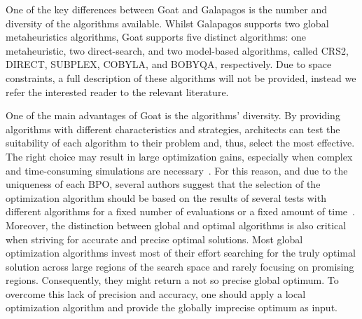	
	
	One of the key differences between Goat and Galapagos is the number and diversity of the algorithms available. Whilst Galapagos supports two global metaheuristics algorithms, Goat supports five distinct algorithms: one metaheuristic, two direct-search, and two model-based algorithms, called CRS2, DIRECT, SUBPLEX, COBYLA, and BOBYQA, respectively. Due to space constraints, a full description of these algorithms will not be provided, instead we refer the interested reader to the relevant literature.  
	
	One of the main advantages of Goat is the algorithms' diversity. By providing algorithms with different characteristics and strategies, architects can test the suitability of each algorithm to their problem and, thus, select the most effective. The right choice may result in large optimization gains, especially when complex and time-consuming simulations are necessary~\cite{Wortmann2016BBO}. For this reason, and due to the uniqueness of each \ac{BPO}, several authors suggest that the selection of the optimization algorithm should be based on the results of several tests with different algorithms for a fixed number of evaluations or a fixed amount of time~\cite{Hamdy2016,Wortmann2016BBO}. Moreover, the distinction between global and optimal algorithms is also critical when striving for accurate and precise optimal solutions. Most global optimization algorithms invest most of their effort searching for the truly optimal solution across large regions of the search space and rarely focusing on promising regions. Consequently, they might return a not so precise global optimum. To overcome this lack of precision and accuracy, one should apply a local optimization algorithm and provide the globally imprecise optimum as input.
	
	
	
	
